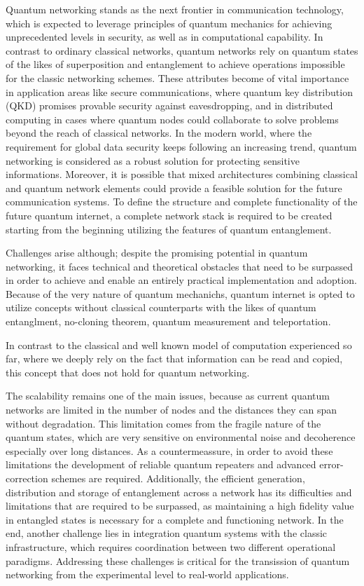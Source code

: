\documentclass[12pt,a4paper] {report}
\begin{document}
		Quantum networking stands as the next frontier in communication technology,
		which is expected to leverage principles of quantum mechanics for
		achieving unprecedented levels in security, as well as in computational capability.
		In contrast to ordinary classical networks, quantum networks rely on quantum states
		of the likes of superposition and entanglement to achieve operations impossible for
	        the classic networking schemes. These attributes become of vital importance in 
		application areas like secure communications, where quantum key distribution (QKD) 
		promises provable security against eavesdropping, and in distributed computing in cases 
		where quantum nodes could collaborate to solve problems beyond the reach of classical networks.
		In the modern world, where the requirement for global data security keeps following
		an increasing trend, quantum networking is considered as a robust solution
		for protecting sensitive informations.
		Moreover, it is possible that mixed architectures combining classical and quantum network elements
		could provide a feasible solution for the future communication systems. 
		To define the structure and complete functionality of the future quantum internet,
		a complete network stack is required to be created starting from the beginning utilizing 
		the features of quantum entanglement\cite{rfc}.

		Challenges arise although; despite the promising potential in quantum networking,
		it faces technical and theoretical obstacles that need to be surpassed
		in order to achieve and enable an entirely practical implementation and adoption.
		Because of the very nature of quantum mechanichs, quantum internet is opted to utilize concepts
		without classical counterparts with the likes of quantum entanglment,
		no-cloning theorem, quantum measurement and teleportation.
		
		In contrast to the classical and well known model of computation experienced so far,
		where we deeply rely on the fact that information can be read and copied, this concept that does not hold
		for quantum networking. 
		
		The scalability remains one of the main issues,
		because as current quantum networks are limited in the number of nodes and the
		distances they can span without degradation.
		This limitation comes from the fragile nature of the quantum states,
		which are very sensitive on environmental noise and decoherence especially over long distances.
		As a countermeassure, in order to avoid these limitations the development of reliable quantum repeaters
		and advanced error-correction schemes are required.	
		Additionally, the efficient generation, distribution and storage of entanglement 
		across a network has its difficulties and limitations that are required to be surpassed, 
		as maintaining a high fidelity value in entangled
		states is necessary for a complete and functioning network.
		In the end, another challenge lies in integration
	        quantum systems with the classic infrastructure,
	        which requires coordination between
	        two different operational paradigms.
	        Addressing these challenges is critical for the transission of 
		quantum networking from the experimental level to real-world applications.
\end{document}

